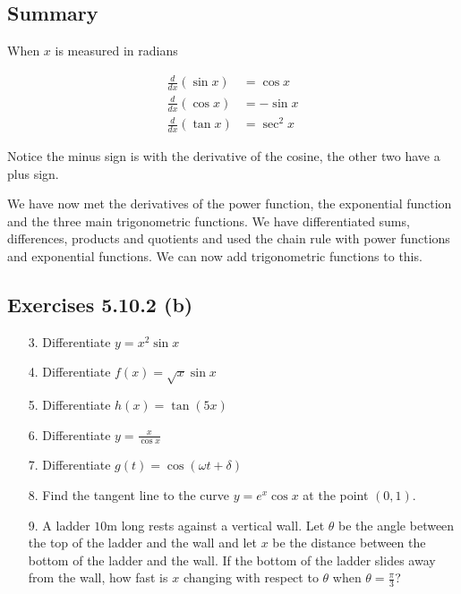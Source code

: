 \subsection{Summary}
When $x$ is measured in radians 


\begin{align*}\frac{d}{d x} \left (\sin  x\right ) &  = \cos  x \\
\frac{d}{d x} \left (\cos  x\right ) &  =  -\sin  x \\
\frac{d}{d x} \left (\tan  x\right ) &  = \sec ^{2} x\end{align*}

Notice the minus sign is with the derivative of the cosine, the other two have a plus sign. 

We have now met the derivatives of the power function, the exponential function and the three main trigonometric functions. We
have differentiated sums, differences, products and quotients and used the chain rule with power functions and exponential functions. We
can now add trigonometric functions to this. 

\subsection{Exercises 5.10.2 (b)}
\begin{enumerate}
\item [3.] Differentiate $y =x^{2} \sin  x$ 

\item [4.] Differentiate $f (x) =\sqrt{x} \sin  x$ 

\item [5.] Differentiate $h (x) =\tan  (5 x)$ 

\item [6.] Differentiate $y =\frac{x}{\cos  x}$ 

\item [7.] Differentiate $g (t) =\cos  (\omega  t +\delta )$ 

\item [8.] Find the tangent line to the curve $y =e^{x} \cos  x$ at the point $(0 ,1)$. 

\item [9.]
A ladder $10 \mbox{m}$ long rests against a vertical wall. Let
$\theta $ be the angle between the top of the ladder and the wall and let $x$ be the distance between the bottom of the ladder and the wall. If the bottom of
the ladder slides away from the wall, how fast is $x$ changing with respect to $\theta $ when $\theta  =\frac{\pi }{3}$? \end{enumerate}


